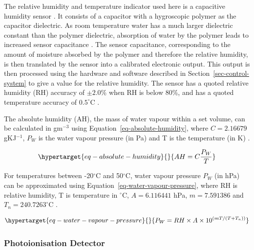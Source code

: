 \documentclass[
  a4paper,
]{scrbook}
\begin{document}
The relative humidity and temperature indicator used here is a
capacitive humidity sensor \autocite{Telairesensor}. It consists of a
capacitor with a hygroscopic polymer as the capacitor dielectric. As
room temperature water has a much larger dielectric constant than the
polymer dielectric, absorption of water by the polymer leads to
increased sensor capacitance \autocite{capacitivesensor}. The sensor
capacitance, corresponding to the amount of moisture absorbed by the
polymer and therefore the relative humidity, is then translated by the
sensor into a calibrated electronic output. This output is then
processed using the hardware and software described in
Section~\ref{sec-control-system} to give a value for the relative
humidity. The sensor has a quoted relative humidity (RH) accuracy of
\(\pm 2.0\)\% when RH is below 80\%, and has a quoted temperature
accuracy of \(0.5^\circ\)C \autocite{Telairesensor}.

The absolute humidity (AH), the mass of water vapour within a set
volume, can be calculated in gm\(^{-3}\) using
Equation~\ref{eq-absolute-humidity}, where \(C = 2.16679\) gKJ\(^{-1}\),
\(P_W\) is the water vapour pressure (in Pa) and T is the temperature
(in K) \autocite{humidityformula}.

\begin{equation}\protect\hypertarget{eq-absolute-humidity}{}{
AH = C\frac{P_W}{T}
}\label{eq-absolute-humidity}\end{equation}

For temperatures between -20\(^\circ\)C and 50\(^\circ\)C, water vapour
pressure \(P_W\) (in hPa) can be approximated using
Equation~\ref{eq-water-vapour-pressure}, where RH is relative humidity,
T is temperature in \(^\circ\)C, \(A = 6.116441\) hPa, \(m = 7.591386\)
and \(T_{n} = 240.7263^\circ\)C \autocite{humidityformula}.

\begin{equation}\protect\hypertarget{eq-water-vapour-pressure}{}{
P_W = RH \times A \times 10^{(mT/(T+T_{n}))}
}\label{eq-water-vapour-pressure}\end{equation}

\hypertarget{photoionisation-detector}{%
\subsubsection*{Photoionisation
Detector}\label{photoionisation-detector}}
\end{document}
